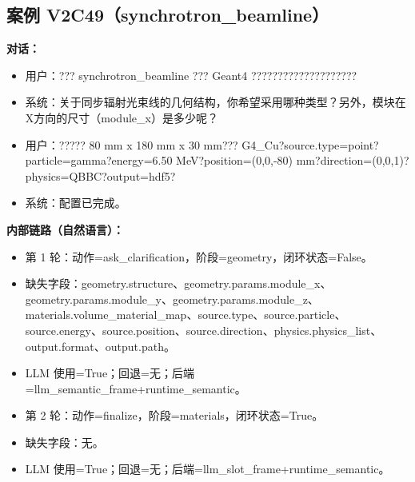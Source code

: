 \documentclass[11pt]{ctexart}
\begin{document}
\subsection{案例 V2C49（synchrotron\_beamline）}
\textbf{对话：}
\begin{itemize}
\item 用户：??? synchrotron\_beamline ??? Geant4 ????????????????????
\item 系统：关于同步辐射光束线的几何结构，你希望采用哪种类型？另外，模块在X方向的尺寸（module\_x）是多少呢？
\item 用户：????? 80 mm x 180 mm x 30 mm??? G4\_Cu?source.type=point?particle=gamma?energy=6.50 MeV?position=(0,0,-80) mm?direction=(0,0,1)?physics=QBBC?output=hdf5?
\item 系统：配置已完成。
\end{itemize}
\textbf{内部链路（自然语言）：}
\begin{itemize}
\item 第 1 轮：动作=ask\_clarification，阶段=geometry，闭环状态=False。
\item 缺失字段：geometry.structure、geometry.params.module\_x、geometry.params.module\_y、geometry.params.module\_z、materials.volume\_material\_map、source.type、source.particle、source.energy、source.position、source.direction、physics.physics\_list、output.format、output.path。
\item LLM 使用=True；回退=无；后端=llm\_semantic\_frame+runtime\_semantic。
\item 第 2 轮：动作=finalize，阶段=materials，闭环状态=True。
\item 缺失字段：无。
\item LLM 使用=True；回退=无；后端=llm\_slot\_frame+runtime\_semantic。
\end{itemize}
\end{document}
